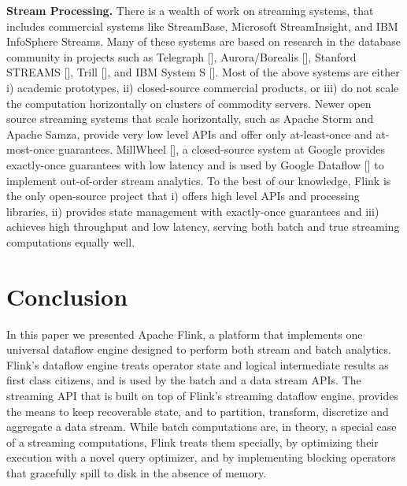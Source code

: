 \documentclass{sig-alternate}
\begin{document}
\textbf{Stream Processing.} There is a wealth of work on streaming systems, that includes commercial systems like StreamBase, Microsoft StreamInsight, and IBM InfoSphere Streams. Many of these systems are based on research in the database community in projects such as Telegraph [], Aurora/Borealis [], Stanford STREAMS [], Trill [], and IBM System S []. Most of the above systems are either i) academic prototypes, ii) closed-source commercial products, or iii) do not scale the computation horizontally on clusters of commodity servers. Newer open source streaming systems that scale horizontally, such as Apache Storm and Apache Samza, provide very low level APIs and offer only at-least-once and at-most-once guarantees. MillWheel [], a closed-source system at Google provides exactly-once guarantees with low latency and is used by Google Dataflow [] to implement  out-of-order stream analytics. To the best of our knowledge, Flink is the only open-source project that i) offers high level APIs and processing libraries, ii) provides state management with exactly-once guarantees and iii) achieves high throughput and low latency, serving both batch and true streaming computations equally well.

\section{Conclusion}

In this paper we presented Apache Flink, a platform that implements one universal dataflow engine designed to perform both stream and batch analytics. Flink's dataflow engine treats operator state and logical intermediate results as first class citizens, and is used by the batch and a data stream APIs. The streaming API that is built on top of  Flink's streaming dataflow engine, provides the means to keep recoverable state, and to partition, transform, discretize and aggregate a data stream. While batch computations are, in theory, a special case of a streaming computations, Flink treats them specially, by optimizing their execution with a novel query optimizer, and by implementing blocking operators that gracefully spill to disk in the absence of memory. 



\end{document}
